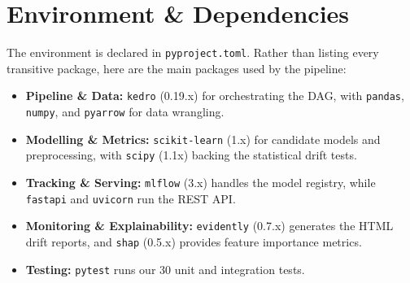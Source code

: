 \documentclass[11pt,a4paper]{article}
\newcommand{\code}[1]{\texttt{\small #1}}
\begin{document}
\section{Environment \& Dependencies}
The environment is declared in \code{pyproject.toml}. Rather than listing every transitive package, here are the main packages used by the pipeline:

\begin{itemize}
    \item \textbf{Pipeline \& Data:} \code{kedro} (0.19.x) for orchestrating the DAG, with \code{pandas}, \code{numpy}, and \code{pyarrow} for data wrangling.
    \item \textbf{Modelling \& Metrics:} \code{scikit-learn} (1.x) for candidate models and preprocessing, with \code{scipy} (1.1x) backing the statistical drift tests.
    \item \textbf{Tracking \& Serving:} \code{mlflow} (3.x) handles the model registry, while \code{fastapi} and \code{uvicorn} run the REST API.
    \item \textbf{Monitoring \& Explainability:} \code{evidently} (0.7.x) generates the HTML drift reports, and \code{shap} (0.5.x) provides feature importance metrics.
    \item \textbf{Testing:} \code{pytest} runs our 30 unit and integration tests.
\end{itemize}
\end{document}
